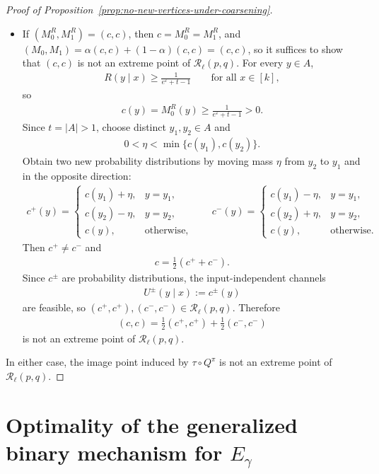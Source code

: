 \documentclass{article}
\theoremstyle{plain}
\theoremstyle{definition}
\theoremstyle{plain}
\newcommand{\eps}{\varepsilon}
\begin{document}
\begin{proof}[Proof of Proposition~\ref{prop:no-new-vertices-under-coarsening}]
\begin{itemize}
    \item If $(M_0^R,M_1^R)=(c,c)$, then $c=M_0^R=M_1^R$, and $(M_0,M_1)=\alpha(c,c)+(1-\alpha)(c,c)=(c,c)$, so it suffices to show that $(c,c)$ is not an extreme point of $\mathcal R_\ell(p,q)$. For every $y\in A$,
\begin{align*}
    R(y\mid x)\ge \frac{1}{e^\eps+t-1}\qquad \text{for all }x\in[k],
\end{align*}
so
\begin{align*}
    c(y)=M_0^R(y)\ge \frac{1}{e^\eps+t-1}>0.
\end{align*}
Since $t=|A|>1$, choose distinct $y_1,y_2\in A$ and
\begin{align*}
    0<\eta<\min\{c(y_1),c(y_2)\}.
\end{align*}
Obtain two new probability distributions by moving mass $\eta$ from $y_2$ to $y_1$ and in the opposite direction:
\begin{align*}
    c^+(y)=
    \begin{cases}
    c(y_1)+\eta, & y=y_1,\\
    c(y_2)-\eta, & y=y_2,\\
    c(y), & \text{otherwise},
    \end{cases}
    \qquad
    c^-(y)=
    \begin{cases}
    c(y_1)-\eta, & y=y_1,\\
    c(y_2)+\eta, & y=y_2,\\
    c(y), & \text{otherwise}.
    \end{cases}
\end{align*}
Then $c^+\neq c^-$ and
\begin{align*}
    c=\frac12(c^++c^-).
\end{align*}
Since $c^\pm$ are probability distributions, the input-independent channels
\begin{align*}
    U^\pm(y\mid x):=c^\pm(y)
\end{align*}
are feasible, so $(c^+,c^+),(c^-,c^-)\in \mathcal R_\ell(p,q)$. Therefore
\begin{align*}
    (c,c)=\frac12(c^+,c^+)+\frac12(c^-,c^-)
\end{align*}
is not an extreme point of $\mathcal R_\ell(p,q)$.

\end{itemize}

In either case, the image point induced by $\tau\circ Q^\pi$ is not an extreme point of $\mathcal R_\ell(p,q)$.
\end{proof}

\section{Optimality of the generalized binary mechanism for \texorpdfstring{$E_\gamma$}{E\_gamma}}
\label{sec:proof-optimal-egamma}
\end{document}
